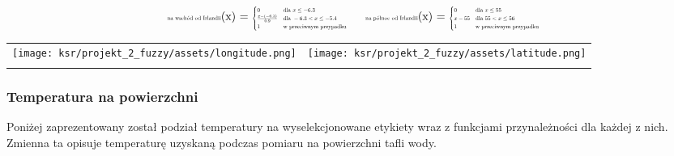 \documentclass{article}
\begin{document}
\begin{equation*}
\begin{minipage}{0.5\textwidth}
\centering
\text{\scalebox{0.5}{na wschód od Irlandii}}(x) = \scalebox{0.5}{$
\begin{cases}
0 & \text{dla } x \leq -6.3 \\
\frac{x - (-6.3)}{0.9} & \text{dla } -6.3 < x \leq -5.4 \\
1 & \text{w przeciwnym przypadku}
\end{cases}
$}
\end{minipage}%
\begin{minipage}{0.5\textwidth}
\centering
\text{\scalebox{0.5}{na północ od Irlandii}}(x) = \scalebox{0.5}{$
\begin{cases}
0 & \text{dla } x \leq 55 \\
x - 55 & \text{dla } 55 < x \leq 56 \\
1 & \text{w przeciwnym przypadku}
\end{cases}
$}
\end{minipage}
\end{equation*}




\begin{table}[H]
\centering
\begin{tabular}{cc}
    \texttt{[image: ksr/projekt\_2\_fuzzy/assets/longitude.png]} &
    \texttt{[image: ksr/projekt\_2\_fuzzy/assets/latitude.png]} \\
     \\
\end{tabular}
\label{fig:two_images}
\end{table}

\subsubsection{Temperatura na powierzchni}

\noindent Poniżej zaprezentowany został podział temperatury na wyselekcjonowane etykiety wraz z funkcjami przynależności dla każdej z nich. Zmienna ta opisuje temperaturę uzyskaną podczas pomiaru na powierzchni tafli wody.
\end{document}
